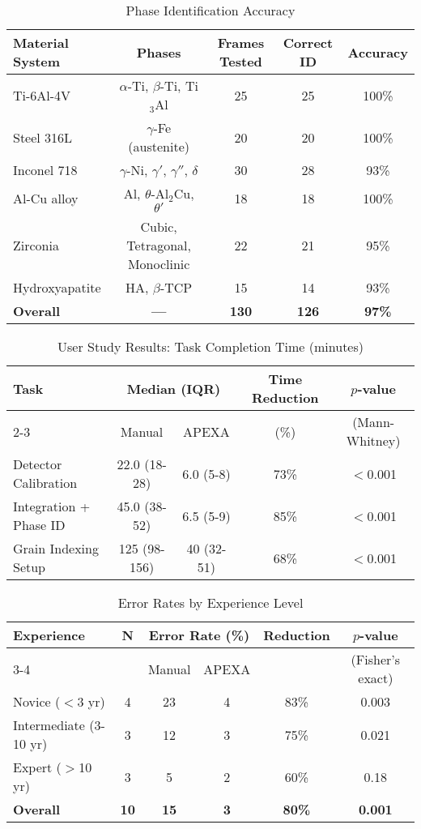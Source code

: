 \documentclass[11pt]{article}
\begin{document}
\begin{table}[htbp]
\centering
\caption{Phase Identification Accuracy}
\label{tab:phase_accuracy}
\begin{tabular}{lcccc}
\toprule
Material System & Phases & Frames Tested & Correct ID & Accuracy \\
\midrule
Ti-6Al-4V & $\alpha$-Ti, $\beta$-Ti, Ti$_3$Al & 25 & 25 & 100\% \\
Steel 316L & $\gamma$-Fe (austenite) & 20 & 20 & 100\% \\
Inconel 718 & $\gamma$-Ni, $\gamma'$, $\gamma''$, $\delta$ & 30 & 28 & 93\% \\
Al-Cu alloy & Al, $\theta$-Al$_2$Cu, $\theta'$ & 18 & 18 & 100\% \\
Zirconia & Cubic, Tetragonal, Monoclinic & 22 & 21 & 95\% \\
Hydroxyapatite & HA, $\beta$-TCP & 15 & 14 & 93\% \\
\midrule
\textbf{Overall} & \textbf{---} & \textbf{130} & \textbf{126} & \textbf{97\%} \\
\bottomrule
\end{tabular}
\end{table}

\begin{table}[htbp]
\centering
\caption{User Study Results: Task Completion Time (minutes)}
\label{tab:user_study_time}
\begin{tabular}{lcccc}
\toprule
\multirow{2}{*}{Task} & \multicolumn{2}{c}{Median (IQR)} & Time Reduction & $p$-value \\
\cmidrule{2-3}
& Manual & APEXA & (\%) & (Mann-Whitney) \\
\midrule
Detector Calibration & 22.0 (18-28) & 6.0 (5-8) & 73\% & $<$0.001 \\
Integration + Phase ID & 45.0 (38-52) & 6.5 (5-9) & 85\% & $<$0.001 \\
Grain Indexing Setup & 125 (98-156) & 40 (32-51) & 68\% & $<$0.001 \\
\bottomrule
\end{tabular}
\end{table}

\begin{table}[htbp]
\centering
\caption{Error Rates by Experience Level}
\label{tab:error_rates}
\begin{tabular}{lccccc}
\toprule
\multirow{2}{*}{Experience} & \multirow{2}{*}{N} & \multicolumn{2}{c}{Error Rate (\%)} & \multirow{2}{*}{Reduction} & \multirow{2}{*}{$p$-value} \\
\cmidrule{3-4}
& & Manual & APEXA & & (Fisher's exact) \\
\midrule
Novice ($<$3 yr) & 4 & 23 & 4 & 83\% & 0.003 \\
Intermediate (3-10 yr) & 3 & 12 & 3 & 75\% & 0.021 \\
Expert ($>$10 yr) & 3 & 5 & 2 & 60\% & 0.18 \\
\midrule
\textbf{Overall} & \textbf{10} & \textbf{15} & \textbf{3} & \textbf{80\%} & \textbf{0.001} \\
\bottomrule
\end{tabular}
\end{table}
\end{document}

